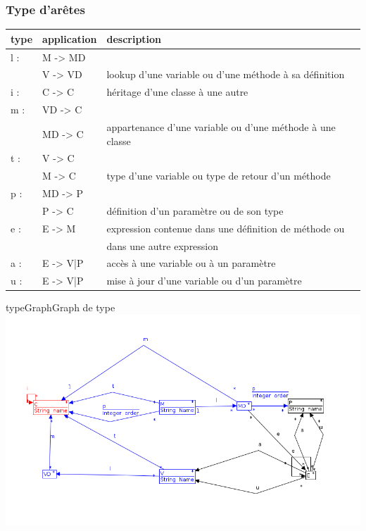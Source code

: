 \documentclass[a4paper, 12pt]{article}
\begin{document}
  \subsubsection{Type d'arêtes}
  \begin{tabular}{ | l | l |  l |}
    \hline type & application & description  \\ \hline
    l : & M -> MD & \\ & V -> VD & lookup d'une variable ou d'une méthode à sa définition \\ \hline
    i : & C -> C &  héritage d'une classe à une autre  \\ \hline
    m : & VD -> C & \\ & MD -> C & appartenance d'une variable ou d'une méthode à une classe  \\ \hline
    t : & V -> C  & \\ &  M -> C & type d'une variable ou type de retour d'un méthode   \\ \hline
    p : & MD -> P  & \\ &  P -> C & définition d'un paramètre ou de son type     \\ \hline
    e : & E -> M & expression contenue dans une définition de méthode ou \\ & &  dans une autre expression    \\ \hline
    a : & E -> {V|P} & accès à une variable ou à un paramètre    \\ \hline
    u : & E -> {V|P} & mise à jour d'une variable ou d'un paramètre    \\ \hline
  \end{tabular}

  \begin{myfig}{typeGraph}{Graph de type}
    \includegraphics[width=\textwidth]{typeGraph.png}
  \end{myfig}
\end{document}
